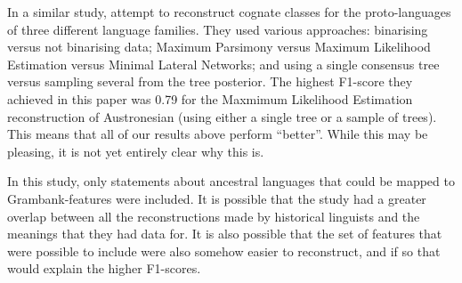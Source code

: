\documentclass[a4paper,10pt]{article} %
\begin{document}
In a similar study, \citet{jager2018using} attempt to reconstruct cognate classes for the proto-languages of three different language families. They used various approaches: binarising versus not binarising data; Maximum Parsimony versus Maximum Likelihood Estimation versus Minimal Lateral Networks; and using a single consensus tree versus sampling several from the tree posterior. The highest F1-score they achieved in this paper was 0.79 for the Maxmimum Likelihood Estimation reconstruction of Austronesian (using either a single tree or a sample of trees). This means that all of our results above perform ``better''. While this may be pleasing, it is not yet entirely clear why this is. 

In this study, only statements about ancestral languages that could be mapped to Grambank-features were included. It is  possible that the \citet{jager2018using} study had a greater overlap between all the reconstructions made by historical linguists and the meanings that they had data for. It is also possible that the set of features that were possible to include were also somehow easier to reconstruct, and if so that would explain the higher F1-scores.
\end{document}
